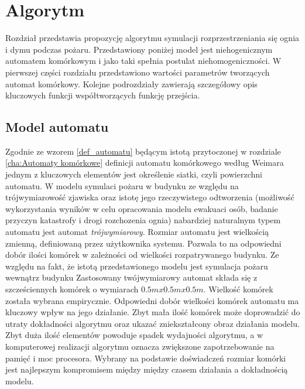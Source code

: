﻿%
\chapter{Algorytm}
\label{cha:Algorytm}
Rozdział przedstawia propozycję algorytmu symulacji rozprzestrzeniania się ognia i dymu podczas pożaru.
Przedstawiony poniżej model jest niehogenicznym automatem komórkowym i jako taki spełnia postulat niehomogeniczności.
W pierwszej części rozdziału przedstawiono wartości parametrów tworzących automat komórkowy. Kolejne podrozdziały 
zawierają szczegółowy opis kluczowych funkcji współtworzących funkcję przejścia.
\section {Model automatu}
Zgodnie ze wzorem \ref{def_automatu} będącym istotą przytoczonej w rozdziale \ref{cha:Automaty komórkowe} definicji automatu komórkowego według Weimara jednym z kluczowych elementów jest określenie siatki, czyli powierzchni automatu. W modelu symulaci pożaru w budynku
ze względu na trójwymiarowość zjawiska oraz istotę jego rzeczywistego odtworzenia (możliwość wykorzystania wyników w celu
opracowania modelu ewakuaci osób, badanie przyczyn katastrofy i drogi rozchozenia ognia) nabardziej naturalnym typem automatu 
jest automat \textsl {trójwymiarowy}. 
Rozmiar automatu jest wielkością zmienną, definiowaną przez użytkownika systemu. Pozwala to na odpowiedni dobór ilości komórek w zależności od wielkości rozpatrywanego budynku. Ze względu na fakt, że istotą przedstawionego modelu jest symulacja pożaru wewnątrz budynku 
Zastosowany twójwymiarowy automat składa się z szcześciennych komórek o wymiarach $0.5m x 0.5m x 0.5m$. Wielkość komórek została wybrana empirycznie. 
Odpowiedni dobór wielkości komórek automatu ma kluczowy wpływ na jego działanie. Zbyt mała ilość komórek może doprowadzić do utraty
dokładności algorytmu oraz ukazać zniekształcony obraz działania modelu. Zbyt duża ilość elementów powoduje spadek wydajności algorytmu, a w komputerowej realizacji algorytmu oznacza zwiększone zapotrzebowanie na pamięć i moc procesora.
Wybrany na podstawie doświadczeń rozmiar komórki jest najlepszym
kompromisem między między czasem działania a dokładnością modelu.